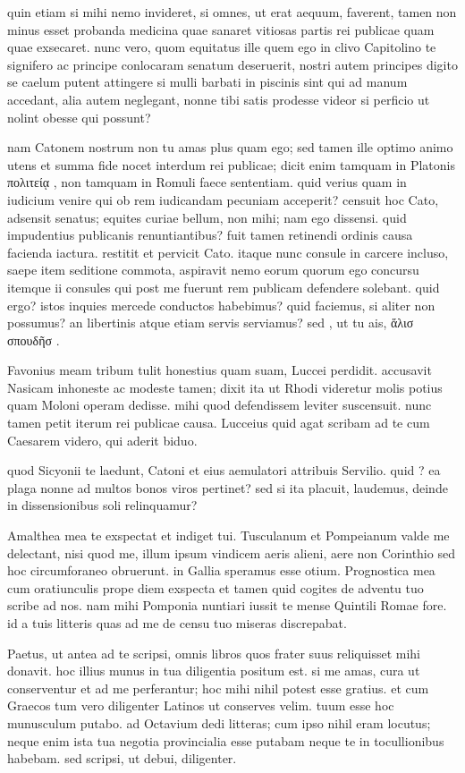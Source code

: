  quin etiam si mihi nemo invideret, si omnes, ut erat aequum, faverent, tamen non minus esset probanda medicina quae sanaret vitiosas partis rei publicae quam quae exsecaret. nunc vero, quom equitatus ille quem ego in clivo Capitolino te signifero ac principe conlocaram senatum deseruerit, nostri autem principes digito se caelum putent attingere si mulli barbati in piscinis sint qui ad manum accedant, alia autem neglegant, nonne tibi satis prodesse videor si perficio ut nolint obesse qui possunt?

 nam Catonem nostrum non tu amas plus quam ego; sed tamen ille optimo animo utens et summa fide nocet interdum rei publicae; dicit enim tamquam in Platonis πολιτείᾳ , non tamquam in Romuli faece sententiam. quid verius quam in iudicium venire qui ob rem iudicandam pecuniam acceperit? censuit hoc Cato, adsensit senatus; equites curiae bellum, non mihi; nam ego dissensi. quid impudentius publicanis renuntiantibus? fuit tamen retinendi ordinis causa facienda iactura. restitit et pervicit Cato. itaque nunc consule in carcere incluso, saepe item seditione commota, aspiravit nemo eorum quorum ego concursu itemque ii consules qui post me fuerunt rem publicam defendere solebant. quid ergo? istos inquies mercede conductos habebimus? quid faciemus, si aliter non possumus? an libertinis atque etiam servis serviamus? sed , ut tu ais, ἅλισ σπουδῆσ .

 Favonius meam tribum tulit honestius quam suam, Luccei perdidit. accusavit Nasicam inhoneste ac modeste tamen; dixit ita ut Rhodi videretur molis potius quam Moloni operam dedisse. mihi quod defendissem leviter suscensuit. nunc tamen petit iterum rei publicae causa. Lucceius quid agat scribam ad te cum Caesarem videro, qui aderit biduo.

 quod Sicyonii te laedunt, Catoni et eius aemulatori attribuis Servilio. quid ? ea plaga nonne ad multos bonos viros pertinet? sed si ita placuit, laudemus, deinde in dissensionibus soli relinquamur?

 Amalthea mea te exspectat et indiget tui. Tusculanum et Pompeianum valde me delectant, nisi quod me, illum ipsum vindicem aeris alieni, aere non Corinthio sed hoc circumforaneo obruerunt. in Gallia speramus esse otium. Prognostica mea cum oratiunculis prope diem exspecta et tamen quid cogites de adventu tuo scribe ad nos. nam mihi Pomponia nuntiari iussit te mense Quintili Romae fore. id a tuis litteris quas ad me de censu tuo miseras discrepabat.

 Paetus, ut antea ad te scripsi, omnis libros quos frater suus reliquisset mihi donavit. hoc illius munus in tua diligentia positum est. si me amas, cura ut conserventur et ad me perferantur; hoc mihi nihil potest esse gratius. et cum Graecos tum vero diligenter Latinos ut conserves velim. tuum esse hoc munusculum putabo. ad Octavium dedi litteras; cum ipso nihil eram locutus; neque enim ista tua negotia provincialia esse putabam neque te in tocullionibus habebam. sed scripsi, ut debui, diligenter.
